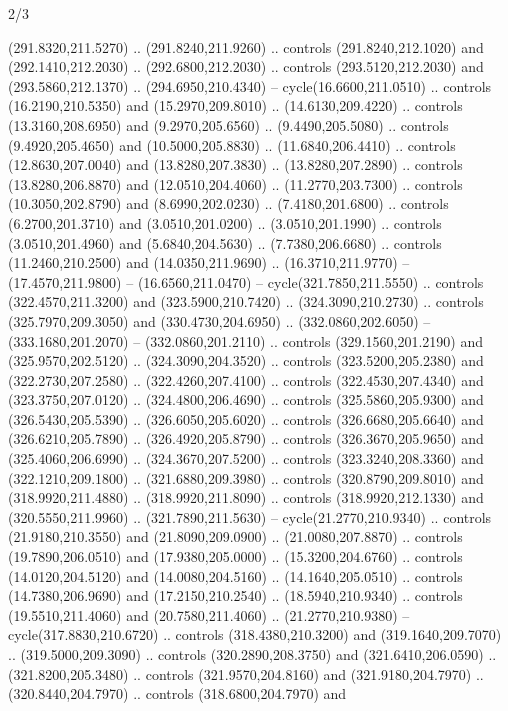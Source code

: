 \begin{flagdescription}{2/3}
\begin{scope}[xshift=0.5\flaglength,yshift=0.5\flagwidth,scale=\stretchfactor]
\begin{scope}[scale=0.001645\flagwidth,yshift=65mm,xshift=-63mm]
\begin{scope}[y=0.80pt, x=0.80pt, yscale=-1,]
\begin{scope}[cm={{1.33333,0.0,0.0,1.33333,(0.0,1e-05)}}]
  (291.8320,211.5270) .. (291.8240,211.9260) .. controls (291.8240,212.1020) and
  (292.1410,212.2030) .. (292.6800,212.2030) .. controls (293.5120,212.2030) and
  (293.5860,212.1370) .. (294.6950,210.4340) -- cycle(16.6600,211.0510) ..
  controls (16.2190,210.5350) and (15.2970,209.8010) .. (14.6130,209.4220) ..
  controls (13.3160,208.6950) and (9.2970,205.6560) .. (9.4490,205.5080) ..
  controls (9.4920,205.4650) and (10.5000,205.8830) .. (11.6840,206.4410) ..
  controls (12.8630,207.0040) and (13.8280,207.3830) .. (13.8280,207.2890) ..
  controls (13.8280,206.8870) and (12.0510,204.4060) .. (11.2770,203.7300) ..
  controls (10.3050,202.8790) and (8.6990,202.0230) .. (7.4180,201.6800) ..
  controls (6.2700,201.3710) and (3.0510,201.0200) .. (3.0510,201.1990) ..
  controls (3.0510,201.4960) and (5.6840,204.5630) .. (7.7380,206.6680) ..
  controls (11.2460,210.2500) and (14.0350,211.9690) .. (16.3710,211.9770) --
  (17.4570,211.9800) -- (16.6560,211.0470) -- cycle(321.7850,211.5550) ..
  controls (322.4570,211.3200) and (323.5900,210.7420) .. (324.3090,210.2730) ..
  controls (325.7970,209.3050) and (330.4730,204.6950) .. (332.0860,202.6050) --
  (333.1680,201.2070) -- (332.0860,201.2110) .. controls (329.1560,201.2190) and
  (325.9570,202.5120) .. (324.3090,204.3520) .. controls (323.5200,205.2380) and
  (322.2730,207.2580) .. (322.4260,207.4100) .. controls (322.4530,207.4340) and
  (323.3750,207.0120) .. (324.4800,206.4690) .. controls (325.5860,205.9300) and
  (326.5430,205.5390) .. (326.6050,205.6020) .. controls (326.6680,205.6640) and
  (326.6210,205.7890) .. (326.4920,205.8790) .. controls (326.3670,205.9650) and
  (325.4060,206.6990) .. (324.3670,207.5200) .. controls (323.3240,208.3360) and
  (322.1210,209.1800) .. (321.6880,209.3980) .. controls (320.8790,209.8010) and
  (318.9920,211.4880) .. (318.9920,211.8090) .. controls (318.9920,212.1330) and
  (320.5550,211.9960) .. (321.7890,211.5630) -- cycle(21.2770,210.9340) ..
  controls (21.9180,210.3550) and (21.8090,209.0900) .. (21.0080,207.8870) ..
  controls (19.7890,206.0510) and (17.9380,205.0000) .. (15.3200,204.6760) ..
  controls (14.0120,204.5120) and (14.0080,204.5160) .. (14.1640,205.0510) ..
  controls (14.7380,206.9690) and (17.2150,210.2540) .. (18.5940,210.9340) ..
  controls (19.5510,211.4060) and (20.7580,211.4060) .. (21.2770,210.9380) --
  cycle(317.8830,210.6720) .. controls (318.4380,210.3200) and
  (319.1640,209.7070) .. (319.5000,209.3090) .. controls (320.2890,208.3750) and
  (321.6410,206.0590) .. (321.8200,205.3480) .. controls (321.9570,204.8160) and
  (321.9180,204.7970) .. (320.8440,204.7970) .. controls (318.6800,204.7970) and

\end{scope}
\end{scope}
\end{scope}
\end{scope}
\end{flagdescription}
